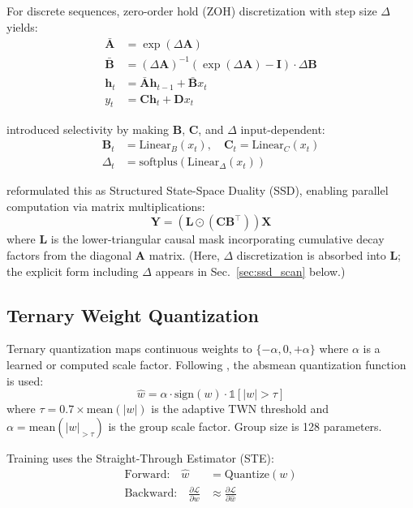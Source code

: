 \documentclass{article}
\begin{document}
For discrete sequences, zero-order hold (ZOH) discretization with step size $\Delta$ yields:
\begin{align}
\bar{\mathbf{A}} &= \exp(\Delta \mathbf{A}) \\
\bar{\mathbf{B}} &= (\Delta \mathbf{A})^{-1}(\exp(\Delta \mathbf{A}) - \mathbf{I}) \cdot \Delta \mathbf{B} \\
\mathbf{h}_t &= \bar{\mathbf{A}} \mathbf{h}_{t-1} + \bar{\mathbf{B}} x_t \\
y_t &= \mathbf{C} \mathbf{h}_t + \mathbf{D} x_t
\end{align}

\citet{gu2024mamba} introduced selectivity by making $\mathbf{B}$, $\mathbf{C}$, and $\Delta$ input-dependent:
\begin{align}
\mathbf{B}_t &= \text{Linear}_B(x_t), \quad \mathbf{C}_t = \text{Linear}_C(x_t) \nonumber \\
\Delta_t &= \text{softplus}(\text{Linear}_\Delta(x_t))
\end{align}

\citet{dao2024transformers} reformulated this as Structured State-Space Duality (SSD), enabling parallel computation via matrix multiplications:
\begin{equation}
\mathbf{Y} = (\mathbf{L} \odot (\mathbf{C} \mathbf{B}^\top)) \mathbf{X}
\end{equation}
where $\mathbf{L}$ is the lower-triangular causal mask incorporating cumulative decay factors from the diagonal $\mathbf{A}$ matrix. (Here, $\Delta$ discretization is absorbed into $\mathbf{L}$; the explicit form including $\Delta$ appears in Sec.~\ref{sec:ssd_scan} below.)

\subsection{Ternary Weight Quantization}

Ternary quantization maps continuous weights to $\{-\alpha, 0, +\alpha\}$ where $\alpha$ is a learned or computed scale factor. Following \citet{ma2024era}, the absmean quantization function is used:
\begin{equation}
\hat{w} = \alpha \cdot \text{sign}(w) \cdot \mathbb{1}[|w| > \tau]
\end{equation}
where $\tau = 0.7 \times \text{mean}(|w|)$ is the adaptive TWN threshold \citep{li2016ternary} and $\alpha = \text{mean}(|w|_{>\tau})$ is the group scale factor. Group size is 128 parameters.

Training uses the Straight-Through Estimator (STE):
\begin{align}
\text{Forward:} \quad \hat{w} &= \text{Quantize}(w) \\
\text{Backward:} \quad \frac{\partial \mathcal{L}}{\partial w} &\approx \frac{\partial \mathcal{L}}{\partial \hat{w}}
\end{align}
\end{document}
